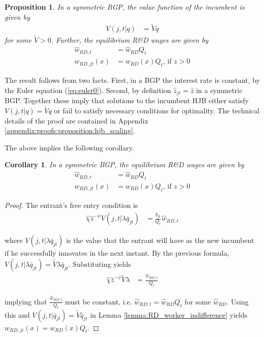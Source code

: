 \documentclass[11pt,english]{article}
\newtheorem{proposition}{Proposition}
\newtheorem{proposition_corollary}{Corollary}[proposition]
\begin{document}
\begin{proposition}\label{proposition:hjb_scaling}
	In a symmetric BGP, the value function of the incumbent is given by
	\begin{align*}
		V(j,t|q) &= \tilde{V} q
	\end{align*}
	for some $\tilde{V} > 0$. Further, the equilibrium R\&D wages are given by 
	\begin{align*}
		\hat{w}_{RD,t} &= \hat{w}_{RD} Q_t \\
		w_{RD,jt}(x) &= w_{RD}(x) Q_t \textrm{, if $z > 0$}
	\end{align*}
\end{proposition}

The result follows from two facts. First, in a BGP the interest rate is constant, by the Euler equation (\ref{eq:euler0}). Second, by definition $\hat{z}_{jt} = \hat{z}$ in a symmetric BGP. Together these imply that solutions to the incumbent HJB either satisfy $V(j,t|q) = \tilde{V} q$ or fail to satisfy necessary conditions for optimality. The technical details of the proof are contained in Appendix \ref{appendix:proofs:proposition:hjb_scaling}. 

The above implies the following corollary.

\begin{proposition_corollary}
	In a symmetric BGP, the equilibrium R\&D wages are given by 
	\begin{align*}
	\hat{w}_{RD,t} &= \hat{w}_{RD} Q_t \\
	w_{RD,jt}(x) &= w_{RD}(x) Q_t \textrm{, if $z > 0$}
	\end{align*}
\end{proposition_corollary}

\begin{proof}
	The entrant's free entry condition is
	\begin{align}
	\hat{\chi} \hat{z}^{-\psi} V(j,t|\lambda \bar{q}_{jt}) &= \frac{\bar{q}_{jt}}{Q_t} \hat{w}_{RD,t}
	\end{align}
	
	where $V(j,t|\lambda \bar{q}_{jt})$ is the value that the entrant will have as the new incumbent if he successfully innovates in the next instant. By the previous formula, $V(j,t | \lambda \bar{q}_{jt}) = \tilde{V} \lambda \bar{q}_{jt}$. Substituting yields
	\begin{align}
	\hat{\chi} \hat{z}^{-\psi} \tilde{V} \lambda &= \frac{\hat{w}_{RD,t}}{Q_t}
	\end{align}
	
	implying that $\frac{\hat{w}_{RD,t}}{Q_t}$ must be constant, i.e. $\hat{w}_{RD,t} = \hat{w}_{RD} Q_t$ for some $\hat{w}_{RD}$. Using this and $V(j,t | \bar{q}_{jt}) = \tilde{V}\bar{q}_{jt}$ in Lemma \ref{lemma:RD_worker_indifference} yields $w_{RD,jt}(x) = w_{RD}(x) Q_t$. 
\end{proof}
\end{document}
